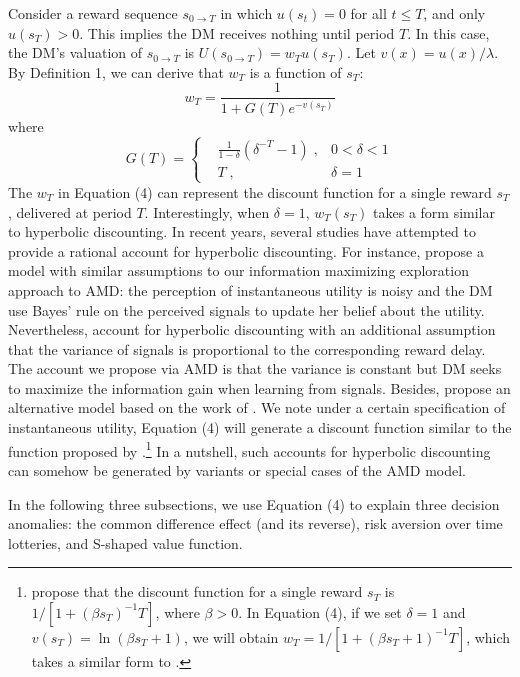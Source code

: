 \documentclass[
  12pt,
]{article}
\begin{document}
Consider a reward sequence \(s_{0\rightarrow T}\) in which \(u(s_t)=0\)
for all \(t\leq T\), and only \(u(s_T)>0\). This implies the DM receives
nothing until period \(T\). In this case, the DM's valuation of
\(s_{0\rightarrow T}\) is \(U(s_{0\rightarrow T})=w_Tu(s_T)\). Let
\(v(x)=u(x)/\lambda\). By Definition 1, we can derive that \(w_T\) is a
function of \(s_T\):\[\tag{4}
 w_T = \frac{1}{1+G(T)e^{-v(s_T)}}
\]where\[ G(T) = \left\{ \begin{aligned} & \frac{1}{1-\delta}(\delta^{-T}-1) \; ,& 0<\delta<1\\ & T\; ,& \delta=1\ \end{aligned} \right. \]The
\(w_T\) in Equation (4) can represent the discount function for a single
reward \(s_T\), delivered at period \(T\). Interestingly, when
\(\delta=1\), \(w_T(s_T)\) takes a form similar to hyperbolic
discounting. In recent years, several studies have attempted to provide
a rational account for hyperbolic discounting. For instance,
\citet{gabaix2017myopia} propose a model with similar assumptions to our
information maximizing exploration approach to AMD: the perception of
instantaneous utility is noisy and the DM use Bayes' rule on the
perceived signals to update her belief about the utility. Nevertheless,
\citet{gabaix2017myopia} account for hyperbolic discounting with an
additional assumption that the variance of signals is proportional to
the corresponding reward delay. The account we propose via AMD is that
the variance is constant but DM seeks to maximize the information gain
when learning from signals. Besides, \citet{gershman2020rationally}
propose an alternative model based on the work of
\citet{gabaix2017myopia}. We note under a certain specification of
instantaneous utility, Equation (4) will generate a discount function
similar to the function proposed by
\citet{gershman2020rationally}.\footnote{\citet{gershman2020rationally}
  propose that the discount function for a single reward \(s_T\) is
  \(1/[1+(\beta s_T)^{-1}T]\), where \(\beta>0\). In Equation (4), if we
  set \(\delta=1\) and \(v(s_T)=\ln(\beta s_T+1)\), we will obtain
  \(w_T = 1/[1+(\beta s_T+1)^{-1}T]\), which takes a similar form to
  \citet{gershman2020rationally}.} In a nutshell, such accounts for
hyperbolic discounting can somehow be generated by variants or special
cases of the AMD model.

In the following three subsections, we use Equation (4) to explain three
decision anomalies: the common difference effect (and its reverse), risk
aversion over time lotteries, and S-shaped value function.
\end{document}
